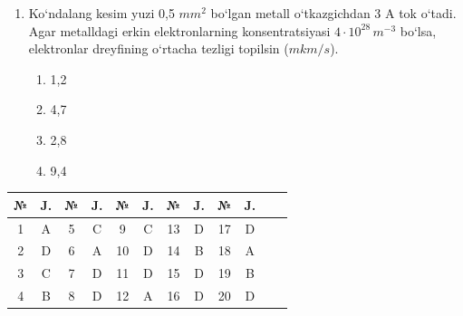 \begin{enumerate}
\item Ko‘ndalang kesim yuzi 0,5 $mm^2$ bo‘lgan metall o‘tkazgichdan 3 A tok o‘tadi. Agar metalldagi erkin elektronlarning konsentratsiyasi $4 \cdot 10^{28} \, m^{-3}$ bo‘lsa, elektronlar dreyfining o‘rtacha tezligi topilsin ($mkm/s$).
\begin{enumerate}[label=\Alph*)]
\item 1,2
\item 4,7
\item 2,8
\item 9,4
\end{enumerate}


\end{enumerate}



\begin{table}[!ht]
\centering
\begin{tabular}{|c|c|c|c|c|c|c|c|c|c|c|c|}
\hline
№ & J. & № & J. & № & J. & № & J. & № & J.  \\ \hline
1 & A & 5 & C & 9 & C & 13 & D & 17 & D  \\ \hline
2 & D & 6 & A & 10 & D & 14 & B & 18 & A  \\ \hline
3 & C & 7 & D & 11 & D & 15 & D & 19 & B  \\ \hline
4 & B & 8 & D & 12 & A & 16 & D & 20 & D  \\ \hline
\end{tabular}
\end{table}